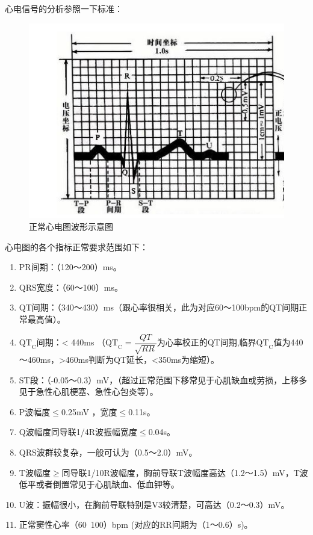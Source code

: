\documentclass{article}
\begin{document}
心电信号的分析参照一下标准：

\begin{figure}[H]
	\centering
	\includegraphics[width=0.8\linewidth]{standard.png}
	\caption{正常心电图波形示意图}
	\label{fig:正常心电图波形示意图}
\end{figure}

心电图的各个指标正常要求范围如下：

\begin{enumerate}
	\item PR间期：（120～200）ms。
	\item QRS宽度：（60～100）ms。
	\item QT间期：（340～430）ms（跟心率很相关，此为对应60～100bpm的QT间期正常最高值）。
	\item $ \mathrm{QT}_\mathrm{C} $间期：< 440ms （$ \mathrm{QT}_\mathrm{C}= \dfrac{QT}{\sqrt{RR}} $为心率校正的QT间期,临界$ \mathrm{QT}_\mathrm{C} $值为440～460ms，>460ms判断为QT延长，<350ms为缩短）。
	\item ST段：（-0.05～0.3）mV，（超过正常范围下移常见于心肌缺血或劳损，上移多见于急性心肌梗塞、急性心包炎等）。
	\item P波幅度$ \leqslant $0.25mV ，宽度$ \leqslant $0.11s。
	\item Q波幅度同导联1/4R波振幅宽度$ \leqslant $0.04s。
	\item QRS波群较复杂，一般可认为（0.5～2.0）mV。
	\item T波幅度$ \geqslant $同导联1/10R波幅度，胸前导联T波幅度高达（1.2～1.5）mV，T波低平或者倒置常见于心肌缺血、低血钾等。
	\item U波：振幅很小，在胸前导联特别是V3较清楚，可高达（0.2～0.3）mV。
	\item 正常窦性心率（60~100）bpm (对应的RR间期为（1～0.6）s)。
\end{enumerate}
\end{document}
